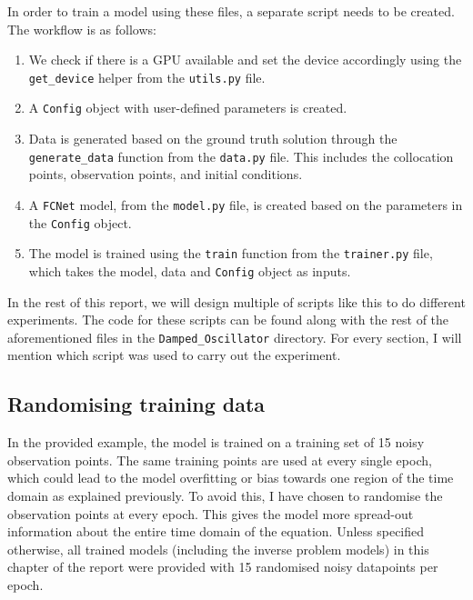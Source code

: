\documentclass[we,twoside,openright,a4paper,11pt]{uantwerpenbamathesis}
\begin{document}
In order to train a model using these files, a separate script needs to be created. The workflow is as follows:
\begin{enumerate}
    \item We check if there is a GPU available and set the device accordingly using the \verb|get_device| helper from the \verb|utils.py| file.
    \item A \verb|Config| object with user-defined parameters is created.
    \item Data is generated based on the ground truth solution through the \verb|generate_data| function from the \verb|data.py| file. This includes the collocation points, observation points, and initial conditions.
    \item A \verb|FCNet| model, from the \verb|model.py| file, is created based on the parameters in the \verb|Config| object.
    \item The model is trained using the \verb|train| function from the \verb|trainer.py| file, which takes the model, data and \verb|Config| object as inputs.
\end{enumerate}
In the rest of this report, we will design multiple of scripts like this to do different experiments. The code for these scripts can be found along with the rest of the aforementioned files in the \verb|Damped_Oscillator| directory. For every section, I will mention which script was used to carry out the experiment.

\subsection{Randomising training data}
In the provided example, the model is trained on a training set of 15 noisy observation points. The same training points are used at every single epoch, which could lead to the model overfitting or bias towards one region of the time domain as explained previously. To avoid this, I have chosen to randomise the observation points at every epoch. This gives the model more spread-out information about the entire time domain of the equation. Unless specified otherwise, all trained models (including the inverse problem models) in this chapter of the report were provided with 15 randomised noisy datapoints per epoch.\\
\end{document}
